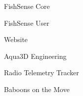 \item FishSense Core
\item FishSense User
\item Website
\item Aqua3D Engineering
\item Radio Telemetry Tracker
\item Baboons on the Move
